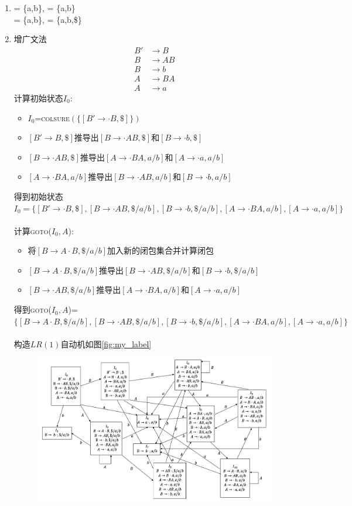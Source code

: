 \documentclass[a4paper, justified]{tufte-handout}
\begin{document}
\begin{solution}
\begin{enumerate}[(1)]
    \item {} = \{a,b\},  = \{a,b\}\\
     = \{a,b\},  = \{a,b,\$\}
    \item 增广文法\\
    \begin{align*}
    B' &\to B \\[8pt]
    B &\to AB \\[8pt]
    B &\to b \\[8pt]
    A &\to BA \\[8pt]
    A &\to a
  \end{align*}
  计算初始状态$I_0$:
  \begin{itemize}
      \item $I_0$=\textsc{colsure}$(\{[B'\to \cdot B,\$]\})$
      \item $[B'\to B, \$]$推导出$[B\to\cdot AB,\$]$和$[B\to\cdot b,\$]$
      \item $[B\to\cdot AB, \$]$推导出$[A\to\cdot BA,a/b]$和$[A\to\cdot a, a/b]$
      \item $[A\to\cdot BA,a/b]$推导出$[B\to\cdot AB, a/b]$和$[B\to\cdot b,a/b]$
  \end{itemize}
  得到初始状态$I_0=\{[B'\to\cdot B,\$],[B\to\cdot AB,\$/a/b],[B\to\cdot b,\$/a/b],[A\to\cdot BA,a/b],[A\to\cdot a,a/b]\}$\\\\
  计算\textsc{goto}($I_0,A$):
  \begin{itemize}
      \item 将$[B\to A\cdot B,\$/a/b]$加入新的闭包集合并计算闭包
      \item $[B\to A\cdot B,\$/a/b]$推导出$[B\to\cdot AB,\$/a/b]$和$[B\to \cdot b,\$/a/b]$
      \item $[B\to \cdot AB,\$/a/b]$推导出$[A\to\cdot BA,a/b]$和$[A\to\cdot a,a/b]$
  \end{itemize}
  得到\textsc{goto}($I_0,A$)=$\{[B\to A\cdot B,\$/a/b],[B\to\cdot AB,\$/a/b],[B\to \cdot b,\$/a/b],[A\to\cdot BA,a/b],[A\to\cdot a,a/b]\}$\\\\
  构造$LR(1)$自动机如图\ref{fig:my_label}
  \begin{figure}
      \centering
      \includegraphics[scale=0.4]{fig/lr1.png}

\end{figure}
\end{enumerate}
\end{solution}
\end{document}
